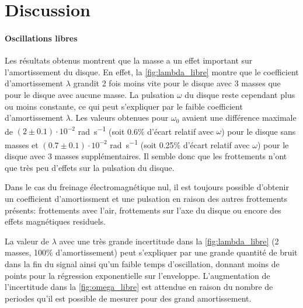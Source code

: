 \section{Discussion}

\paragraph{Oscillations libres}
Les résultats obtenus montrent que la masse a un effet important sur l'amortissement du disque. En effet, la \autoref{fig:lambda_libre} montre que le coefficient d'amortissement \(\lambda\) grandit 2 fois moins vite pour le disque avec 3 masses que pour le disque avec aucune masse. La pulsation \(\omega\) du disque reste cependant plus ou moins constante, ce qui peut s'expliquer par le faible coefficient d'amortissement \(\lambda\). Les valeurs obtenues pour \(\omega_0\) avaient une différence maximale de \((2 \pm 0.1) \cdot 10^{-2}\) \si{\radian\per\second} (soit 0.6\% d'écart relatif avec \(\omega\)) pour le disque sans masses et \((0.7 \pm 0.1) \cdot 10^{-2}\) \si{\radian\per\second} (soit 0.25\% d'écart relatif avec \(\omega\)) pour le disque avec 3 masses supplémentaires. Il semble donc que les frottements n'ont que très peu d'effets sur la pulsation du disque.

Dans le cas du freinage électromagnétique nul, il est toujours possible d'obtenir un coefficient d'amortissment et une pulsation en raison des autres frottements présents: frottements avec l'air, frottements sur l'axe du disque ou encore des effets magnétiques residuels.

La valeur de \(\lambda\) avec une très grande incertitude dans la \autoref{fig:lambda_libre} (2 masses, 100\% d'amortissement) peut s'expliquer par une grande quantité de bruit dans la fin du signal ainsi qu'un faible temps d'oscillation, donnant moins de points pour la régression exponentielle sur l'enveloppe. L'augmentation de l'incertitude dans la \autoref{fig:omega_libre} est attendue en raison du nombre de periodes qu'il est possible de mesurer pour des grand amortissement.